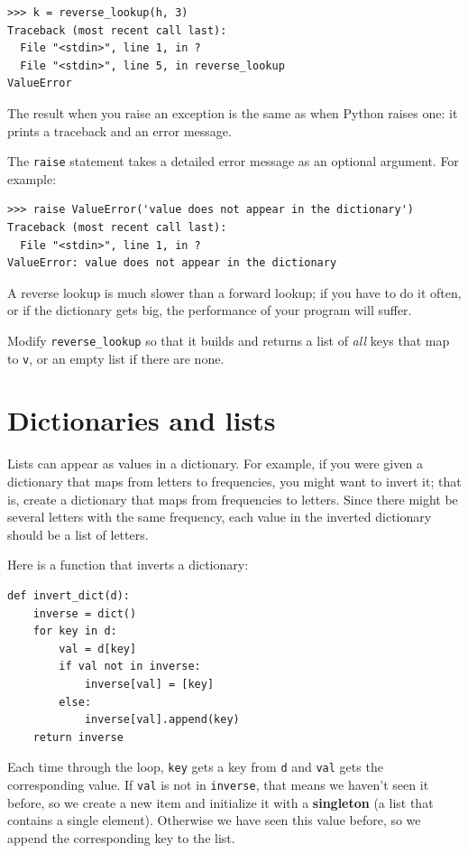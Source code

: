 \documentclass[10pt]{book}
\begin{document}
\begin{verbatim}
>>> k = reverse_lookup(h, 3)
Traceback (most recent call last):
  File "<stdin>", line 1, in ?
  File "<stdin>", line 5, in reverse_lookup
ValueError
\end{verbatim}
%
The result when you raise an exception is the same as when
Python raises one: it prints a traceback and an error message.

The {\tt raise} statement takes a detailed error message as an
optional argument.  For example:

\begin{verbatim}
>>> raise ValueError('value does not appear in the dictionary')
Traceback (most recent call last):
  File "<stdin>", line 1, in ?
ValueError: value does not appear in the dictionary
\end{verbatim}
%
A reverse lookup is much slower than a forward lookup; if you
have to do it often, or if the dictionary gets big, the performance
of your program will suffer.

\begin{exercise}

Modify \verb"reverse_lookup" so that it builds and returns a list
of {\em all} keys that map to {\tt v}, or an empty list if there
are none.

\end{exercise}


\section{Dictionaries and lists}
\label{invert}

Lists can appear as values in a dictionary.  For example, if you
were given a dictionary that maps from letters to frequencies, you
might want to invert it; that is, create a dictionary that maps
from frequencies to letters.  Since there might be several letters
with the same frequency, each value in the inverted dictionary
should be a list of letters.

Here is a function that inverts a dictionary:

\begin{verbatim}
def invert_dict(d):
    inverse = dict()
    for key in d:
        val = d[key]
        if val not in inverse:
            inverse[val] = [key]
        else:
            inverse[val].append(key)
    return inverse
\end{verbatim}
%
Each time through the loop, {\tt key} gets a key from {\tt d} and 
{\tt val} gets the corresponding value.  If {\tt val} is not in {\tt inverse},
that means we haven't seen it before, so we create a new item and
initialize it with a {\bf singleton} (a list that contains a
single element).  Otherwise we have seen this value before, so we
append the corresponding key to the list.
\end{document}
